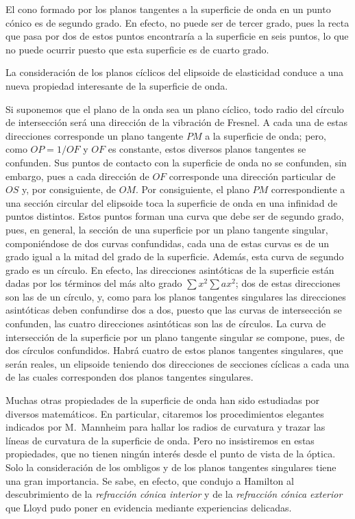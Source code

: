El cono formado por los planos tangentes a la superficie de onda en un
punto cónico es de segundo grado. En efecto, no puede ser de tercer
grado, pues la recta que pasa por dos de estos puntos encontraría a la
superficie en seis puntos, lo que no puede ocurrir puesto que esta
superficie es de cuarto grado.

La consideración de los planos cíclicos del elipsoide de elasticidad
conduce a una nueva propiedad interesante de la superficie de onda.

Si suponemos que el plano de la onda sea un plano cíclico, todo radio del
círculo de intersección será una dirección de la vibración de Fresnel. A
cada una de estas direcciones corresponde un plano tangente $PM$ a la
superficie de onda; pero, como $OP=1/OF$ y $OF$ es constante, estos
diversos planos tangentes se confunden. Sus puntos de contacto con la
superficie de onda no se confunden, sin embargo, pues a cada dirección de
$OF$ corresponde una dirección particular de $OS$ y, por consiguiente, de
$OM$. Por consiguiente, el plano $PM$ correspondiente a una sección
circular del elipsoide toca la superficie de onda en una infinidad de
puntos distintos. Estos puntos forman una curva que debe ser de segundo
grado, pues, en general, la sección de una superficie por un plano
tangente singular, componiéndose de dos curvas confundidas, cada una de
estas curvas es de un grado igual a la mitad del grado de la superficie.
Además, esta curva de segundo grado es un círculo. En efecto, las
direcciones asintóticas de la superficie están dadas por los términos del
más alto grado $\sum x^2\sum ax^2$; dos de estas direcciones son las de
un círculo, y, como para los planos tangentes singulares las direcciones
asintóticas deben confundirse dos a dos, puesto que las curvas de
intersección se confunden, las cuatro direcciones asintóticas son las de
círculos. La curva de intersección de la superficie por un plano tangente
singular se compone, pues, de dos círculos confundidos. Habrá cuatro de
estos planos tangentes singulares, que serán reales, un elipsoide teniendo
dos direcciones de secciones cíclicas a cada una de las cuales
corresponden dos planos tangentes singulares.

Muchas otras propiedades de la superficie de onda han sido estudiadas por
diversos matemáticos. En particular, citaremos los procedimientos
elegantes indicados por M.~Mannheim para hallar los radios de curvatura y
trazar las líneas de curvatura de la superficie de onda. Pero no
insistiremos en estas propiedades, que no tienen ningún interés desde el
punto de vista de la óptica. Solo la consideración de los ombligos y de
los planos tangentes singulares tiene una gran importancia. Se sabe, en
efecto, que condujo a Hamilton al descubrimiento de la \emph{refracción
cónica interior} y de la \emph{refracción cónica exterior} que Lloyd pudo
poner en evidencia mediante experiencias delicadas.

